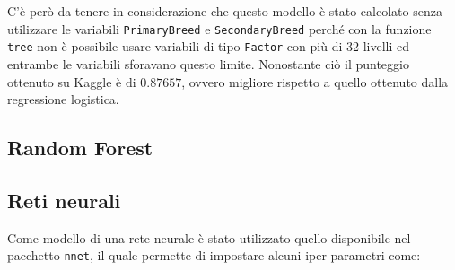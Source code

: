 C'è però da tenere in considerazione che questo modello è stato calcolato senza utilizzare le variabili \texttt{PrimaryBreed} e \texttt{SecondaryBreed} perché con la funzione \texttt{tree} non è possibile usare variabili di tipo \texttt{Factor} con più di 32 livelli ed entrambe le variabili sforavano questo limite. Nonostante ciò il punteggio ottenuto su Kaggle è di $0.87657$, ovvero migliore rispetto a quello ottenuto dalla regressione logistica.

\begin{table}[htbp]
	\centering
	\caption{Errori di classificazione con l'albero di classificazione.}
	\label{tab-reg}
\end{table}

\subsection{Random Forest}

\subsection{Reti neurali}

Come modello di una rete neurale è stato utilizzato quello disponibile nel pacchetto \texttt{nnet}, il quale permette di impostare alcuni iper-parametri come:

